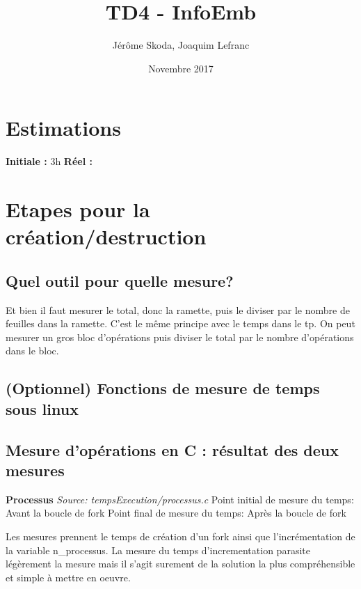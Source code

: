 \documentclass[12pt]{article}
\title{TD4 - InfoEmb}
\author{Jérôme Skoda, Joaquim Lefranc}
\date{Novembre 2017}
\begin{document}
\maketitle

\section{Estimations}
\textbf{Initiale :} 3h
\textbf{Réel :}

\section{Etapes pour la création/destruction}

	\subsection{Quel outil pour quelle mesure?}
		Et bien il faut mesurer le total, donc la ramette, puis le diviser par le nombre de feuilles dans la ramette. C'est le même principe avec le temps dans le tp. On peut mesurer un gros bloc d'opérations puis diviser le total par le nombre d'opérations dans le bloc.

	\subsection{(Optionnel) Fonctions de mesure de temps sous linux}

	\subsection{Mesure d'opérations en C : résultat des deux mesures}

		\textbf{Processus}\newline
		\textit{Source: tempsExecution/processus.c} \newline
		Point initial de mesure du temps: Avant la boucle de fork \newline
		Point final de mesure du temps: Après la boucle de fork \newline
		\newline

		Les mesures prennent le temps de création d'un fork ainsi que l'incrémentation
		de la variable n\_processus. La mesure du temps d'incrementation parasite
		légèrement la mesure mais il s'agit surement de la solution la plus
		compréhensible et simple à mettre en oeuvre.\newline
		\newline
\end{document}
